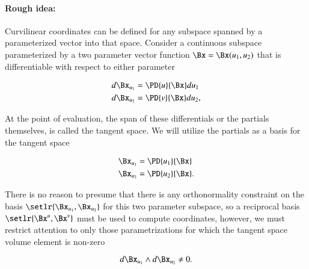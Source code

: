 %
%
\paragraph{Rough idea:}
Curvilinear coordinates can be defined for any subspace spanned by a parameterized vector into that space.
Consider a continuous subspace parameterized by a two parameter vector function \( \Bx = \Bx(u_1, u_2) \) that is differentiable with respect to either parameter

\begin{dmath}\label{eqn:curvilinearDefined:40}
\begin{aligned}
d\Bx_{u_1} &= \PD{u}{\Bx} du_1 \\
d\Bx_{u_2} &= \PD{v}{\Bx} du_2,
\end{aligned}
\end{dmath}

At the point of evaluation, the span of these differentials or the partials themselves, is called the tangent space.
We will utilize the partials as a basis for the tangent space

\begin{dmath}\label{eqn:curvilinearDefined:80}
\begin{aligned}
\Bx_{u_1} &= \PD{u_1}{\Bx} \\
\Bx_{u_2} &= \PD{u_2}{\Bx}.
\end{aligned}
\end{dmath}

There is no reason to presume that there is any orthonormality constraint on the basis \( \setlr{ \Bx_{u_1}, \Bx_{u_2} } \) for this two parameter subspace, so a reciprocal basis \( \setlr{ \Bx^u, \Bx^v } \)
must be used to compute coordinates, however,
we must restrict attention to only those parametrizations for which the tangent space volume element is non-zero

\begin{dmath}\label{eqn:curvilinearDefined:60}
d\Bx_{u_1} \wedge d\Bx_{u_2} \ne 0.
\end{dmath}


